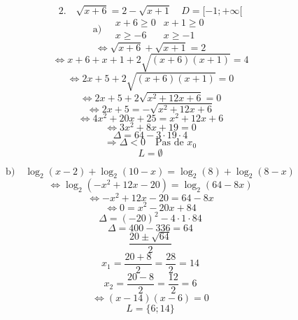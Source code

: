 \documentclass{article}
\begin{document}
\[ \text{2.} \quad \sqrt{x+6} = 2 - \sqrt{x+1} \quad D = [-1; +\infty[ \]
\[ \text{a)} \quad \begin{array}{cc} x+6 \ge 0 & x+1 \ge 0 \\ x \ge -6 & x \ge -1 \end{array} \]
\[ \Leftrightarrow \sqrt{x+6} + \sqrt{x+1} = 2 \]
\[ \Leftrightarrow x+6 + x+1 + 2\sqrt{(x+6)(x+1)} = 4 \]
\[ \Leftrightarrow 2x+5 + 2\sqrt{(x+6)(x+1)} = 0 \]
\[ \Leftrightarrow 2x+5 + 2\sqrt{x^2+12x+6} = 0 \]
\[ \Leftrightarrow 2x+5 = -\sqrt{x^2+12x+6} \]
\[ \Leftrightarrow 4x^2+20x+25 = x^2+12x+6 \]
\[ \Leftrightarrow 3x^2+8x+19 = 0 \]
\[ \Delta = 64 - 3 \cdot 19 \cdot 4 \]
\[ \Rightarrow \Delta < 0 \quad \text{Pas de } x_0 \]
\[ L = \emptyset \]

\[ \text{b)} \quad \log_2(x-2) + \log_2(10-x) = \log_2(8) + \log_2(8-x) \]
\[ \Leftrightarrow \log_2(-x^2 + 12x - 20) = \log_2(64-8x) \]
\[ \Leftrightarrow -x^2+12x-20 = 64-8x \]
\[ \Leftrightarrow 0 = x^2-20x+84 \]
\[ \Delta = (-20)^2 - 4 \cdot 1 \cdot 84 \]
\[ \Delta = 400 - 336 = 64 \]
\[ \frac{20 \pm \sqrt{64}}{2} \]
\[ x_1 = \frac{20+8}{2} = \frac{28}{2} = 14 \]
\[ x_2 = \frac{20-8}{2} = \frac{12}{2} = 6 \]
\[ \Leftrightarrow (x-14)(x-6) = 0 \]
\[ L = \{6; 14\} \]
\end{document}
